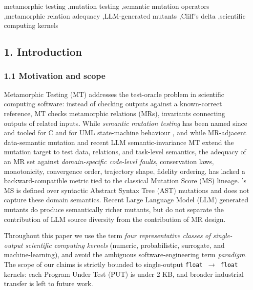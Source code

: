 \documentclass[review,12pt,authoryear]{elsarticle}
\begin{document}
\begin{frontmatter}
\begin{keyword}
metamorphic testing \sep mutation testing \sep semantic mutation operators \sep metamorphic relation adequacy \sep LLM-generated mutants \sep Cliff's delta \sep scientific computing kernels
\end{keyword}

\end{frontmatter}

\subsection{1. Introduction}\label{introduction}

\subsubsection{1.1 Motivation and scope}\label{motivation-and-scope}

Metamorphic Testing (MT) addresses the test-oracle problem in scientific
computing software: instead of checking outputs against a known-correct
reference, MT checks metamorphic relations (MRs), invariants connecting
outputs of related inputs. While \emph{semantic mutation testing} has
been named since \citet{7a6c280d9584691800e71876c716ea229335abeb} and tooled for C \citep{dan2012smtc}
and for UML state-machine behaviour \citep{derezinska2019uml}, and while
MR-adjacent data-semantic mutation \citep{sun2016mumt,sun2024datamutation,zhu2020datamorphic,chan2024metamorphic}
and recent LLM semantic-invariance MT \citep{0fa97cc4e2a0ffb6a777669b1b541c0372fac0d2} extend the mutation target
to test data, relations, and task-level semantics, the adequacy of an MR
set against \emph{domain-specific code-level faults}, conservation laws,
monotonicity, convergence order, trajectory shape, fidelity ordering,
has lacked a backward-compatible metric tied to the classical Mutation
Score (MS) lineage. \citeauthor{d7c38286734419b52de4262c9802ebdfcf4b9447}'s \citeyearpar{d7c38286734419b52de4262c9802ebdfcf4b9447} MS is defined over syntactic
Abstract Syntax Tree (AST) mutations and does not capture these domain
semantics. Recent Large Language Model (LLM) generated mutants \citep{tip2025llmorpheus,humbatova2021deepcrime} do
produce semantically richer mutants, but do not separate the
contribution of LLM source diversity from the contribution of MR design.

Throughout this paper we use the term \emph{four representative classes
of single-output scientific computing kernels} (numeric, probabilistic,
surrogate, and machine-learning), and avoid the ambiguous
software-engineering term \emph{paradigm}. The scope of our claims is
strictly bounded to single-output \texttt{float\ $\to$\ float} kernels: each
Program Under Test (PUT) is under 2 KB, and broader industrial transfer
is left to future work.
\end{document}
